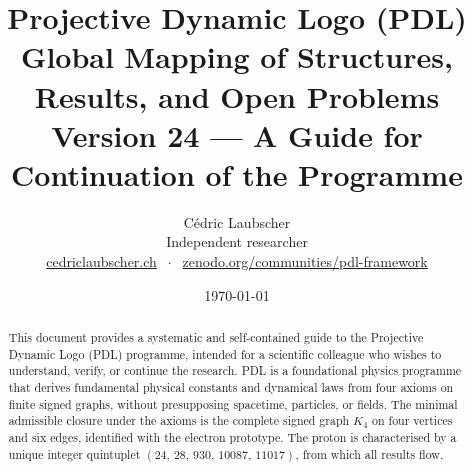 \documentclass[11pt,a4paper]{article}
\title{Projective Dynamic Logo (PDL)\\[4pt]
\large Global Mapping of Structures, Results, and Open Problems\\[2pt]
\normalsize Version 24 --- A Guide for Continuation of the Programme}
\author{C\'edric Laubscher\\[4pt]
\small Independent researcher\\
\small \href{https://cedriclaubscher.ch}{cedriclaubscher.ch}
$\;\cdot\;$
\small \href{https://zenodo.org/communities/pdl-framework/}{zenodo.org/communities/pdl-framework}}
\date{\today}
\theoremstyle{plain}
\theoremstyle{definition}
\theoremstyle{remark}
\newcommand{\Kfour}{K_4}
\newcommand{\quintuplet}{(24,\,28,\,930,\,10087,\,11017)}
\begin{document}
\maketitle
\setcounter{tocdepth}{2}

\begin{abstract}
This document provides a systematic and self-contained guide to the Projective Dynamic Logo (PDL) programme, intended for a scientific colleague who wishes to understand, verify, or continue the research. PDL is a foundational physics programme that derives fundamental physical constants and dynamical laws from four axioms on finite signed graphs, without presupposing spacetime, particles, or fields. The minimal admissible closure under the axioms is the complete signed graph $\Kfour$ on four vertices and six edges, identified with the electron prototype. The proton is characterised by a unique integer quintuplet $\quintuplet$, from which all results flow.


\end{abstract}
\end{document}
